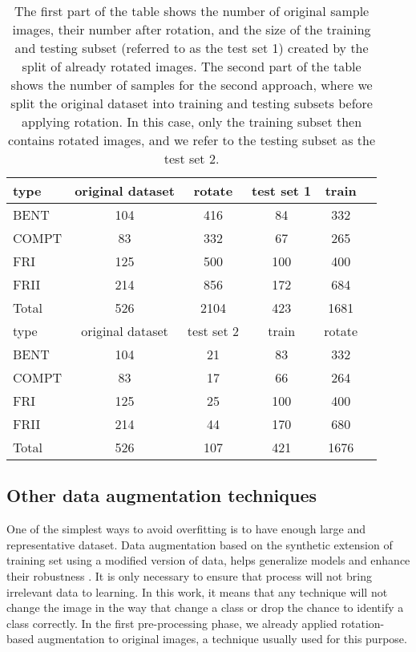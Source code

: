 \documentclass[fleqn,usenatbib]{mnras}
\begin{document}

\begin{table}
	\centering
	\caption{The first part of the table shows the number of original sample images, their number after rotation, and the size of the training and testing subset (referred to as the test set 1) created by the split of already rotated images. The second part of the table shows the number of samples for the second approach, where we split the original dataset into training and testing subsets before applying rotation. In this case, only the training subset then contains rotated images, and we refer to the testing subset as the test set 2.}
	\label{tab:dataset}
	\begin{tabular}{lccccr}
		\hline
		type & original dataset & rotate & test set 1 & train \\
		\hline
		BENT & 104 & 416  & 84 & 332 \\
		COMPT & 83 & 332 & 67 &  265 \\
		FRI & 125 & 500  & 100 &  400\\
		FRII & 214 & 856 & 172 & 684 \\
		\hline
		Total & 526  & 2104 & 423 & 1681\\
		\hline
		\hline
		type & original dataset & test set 2 & train & rotate \\
		\hline
		BENT & 104 & 21 & 83  & 332\\
		COMPT & 83 & 17 &  66  & 264\\
		FRI & 125 & 25 &  100 & 400 \\
		FRII & 214 & 44 & 170 &  680\\
		\hline
		Total & 526  & 107 & 421 & 1676\\
		\hline
	\end{tabular}
\end{table}


\subsection{Other data augmentation techniques}

One of the simplest ways to avoid overfitting is to have enough large and representative dataset. Data augmentation based on the synthetic extension of training set using a modified version of data, helps generalize models and enhance their robustness \citep{han2011data}. It is only necessary to ensure that process will not bring irrelevant data to learning. In this work, it means that any technique will not change the image in the way that change a class or drop the chance to identify a class correctly. In the first pre-processing phase, we already applied rotation-based augmentation to original images, a technique usually used for this purpose. 
\end{document}
